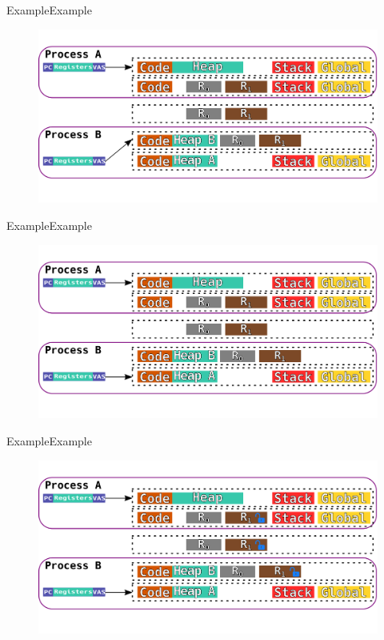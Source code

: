 \documentclass[10pt]{beamer}
\begin{document}
\begin{frame}{Example}{Example}
  \begin{figure}[ht]
    \centering
    \includegraphics[width=1\textwidth, keepaspectratio=true]{images/spacejmp_example_k.png}
  \end{figure}
\end{frame}

\begin{frame}{Example}{Example}
  \begin{figure}[ht]
    \centering
    \includegraphics[width=1\textwidth, keepaspectratio=true]{images/spacejmp_example_l.png}
  \end{figure}
\end{frame}

\begin{frame}{Example}{Example}
  \begin{figure}[ht]
    \centering
    \includegraphics[width=1\textwidth, keepaspectratio=true]{images/spacejmp_example_m.png}
  \end{figure}
\end{frame}
\end{document}
